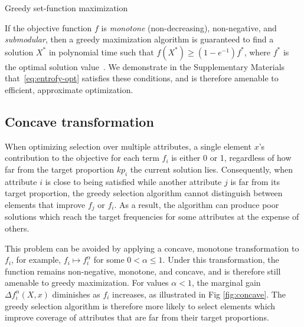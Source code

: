\documentclass[10pt,letterpaper]{article}
\DeclareMathOperator*{\argmax}{argmax}
\begin{document}
\begin{algorithm}[H]
\caption{Greedy set-function maximization}\label{alg:maximize}
\begin{algorithmic}[1]
\State{$X \leftarrow X \cup \left\{\displaystyle\argmax_{x \in S \setminus X} \Delta f(X, x) \right\}$}
\EndWhile{}
\EndProcedure{}
\end{algorithmic}
\end{algorithm}

If the objective function $f$ is \emph{monotone} (non-decreasing), non-negative, and \emph{submodular}, then a greedy maximization algorithm is guaranteed to find a solution $X^*$ in polynomial time such that $f(X^*) \geq (1 - e^{-1}) f^*$, where $f^*$ is the optimal solution value~\cite{fujishige2005submodular}.
We demonstrate in the Supplementary Materials
that~\eqref{eq:entrofy-opt} satisfies these conditions, and is therefore amenable to efficient, approximate optimization.

\subsection*{Concave transformation}
When optimizing selection over multiple attributes, a single element $x$'s contribution to the objective for each term $f_i$ is either 0 or 1, regardless of how far from the target proportion $kp_i$ the current solution lies.
Consequently, when attribute $i$ is close to being satisfied while another attribute $j$ is far from its target proportion, the greedy selection algorithm cannot distinguish between elements that improve $f_j$ or $f_i$.
As a result, the algorithm can produce poor solutions which reach the target frequencies for some attributes at the expense of others.

This problem can be avoided by applying a concave, monotone transformation to $f_i$, for example, $f_i \mapsto f_i^\alpha$ for some ${0 < \alpha \leq 1}$.
Under this transformation, the function remains non-negative, monotone, and concave, and is therefore still amenable to greedy maximization.
For values $\alpha < 1$, the marginal gain $\Delta f_i^\alpha(X, x)$ diminishes as $f_i$ increases, as illustrated in Fig \ref{fig:concave}.
The greedy selection algorithm is therefore more likely to select elements which improve coverage of attributes that are far from their target proportions.
\end{document}
